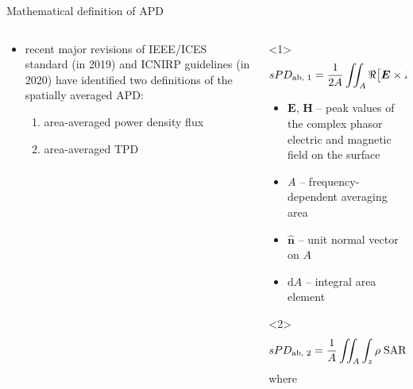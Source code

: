 \documentclass[xcolor=dvipsnames,10pt]{beamer}
\begin{document}
\begin{frame}{Mathematical definition of APD}
    \begin{columns}[c]
        \begin{column}{0.4\textwidth}
            \begin{itemize}
                \item recent major revisions of IEEE/ICES standard (in 2019) and ICNIRP guidelines (in 2020) have identified two definitions of the spatially averaged APD:
                \begin{enumerate}
                    \item<1> area-averaged power density flux
                    \item<2> area-averaged TPD
                \end{enumerate}
            \end{itemize}
        \end{column} 
        \begin{column}{0.6\textwidth}
            \begin{onlyenv}<1>
                \begin{equation*}
                    \centering
                        sPD_\text{ab, 1} = \frac{1}{2A} \iint_{A} \Re \big[\boldsymbol{E} \times \boldsymbol{H}^* \big] \; \boldsymbol{\hat n} \; \mathrm{d}A
                \end{equation*}
                \begin{itemize}
                    \item $\boldsymbol{E}$, $\boldsymbol{H}$ -- peak values of the complex phasor electric and magnetic field on the surface
                    \item $A$ -- frequency-dependent averaging area
                    \item $\boldsymbol{\hat n}$ -- unit normal vector on $A$
                    \item $\mathrm{d}A$ -- integral area element
                \end{itemize}
            \end{onlyenv}
            \begin{onlyenv}<2>
                \begin{equation*}
                    \centering
                    sPD_\text{ab, 2} = \frac{1}{A} \iint_{A} \int_{z} \rho \; \text{SAR} \; \mathrm{d}z \; \mathrm{d}A
                \end{equation*}
                where
                \begin{equation*}

\end{equation*}
\end{onlyenv}
\end{column}
\end{columns}
\end{frame}
\end{document}
